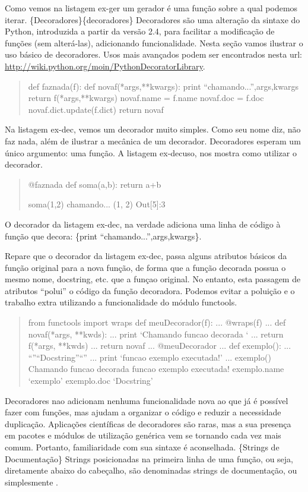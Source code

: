 \documentclass[a4paper,10pt,brazil]{sphinxmanual}
\begin{document}
Como vemos na listagem ex-ger um gerador é uma função sobre a qual
podemos iterar. \{Decoradores\}\{decoradores\} Decoradores são uma
alteração da sintaxe do Python, introduzida a partir da versão 2.4,
para facilitar a modificação de funções (sem alterá-las),
adicionando funcionalidade. Nesta seção vamos ilustrar o uso básico
de decoradores. Usos mais avançados podem ser encontrados nesta
url: \href{http://wiki.python.org/moin/PythonDecoratorLibrary}{http://wiki.python.org/moin/PythonDecoratorLibrary}.
\begin{quote}

def faznada(f): def novaf(*args,**kwargs): print
``chamando...'',args,kwargs return f(*args,**kwargs) novaf.name =
f.name novaf.doc = f.doc novaf.dict.update(f.dict) return novaf
\end{quote}

Na listagem ex-dec, vemos um decorador muito simples. Como seu nome
diz, não faz nada, além de ilustrar a mecânica de um decorador.
Decoradores esperam um único argumento: uma função. A listagem
ex-decuso, nos mostra como utilizar o decorador.
\begin{quote}

@faznada def soma(a,b): return a+b

soma(1,2) chamando... (1, 2) Out{[}5{]}:3
\end{quote}

O decorador da listagem ex-dec, na verdade adiciona uma linha de
código à função que decora: \{print ``chamando...'',args,kwargs\}.

Repare que o decorador da listagem ex-dec, passa alguns atributos
básicos da função original para a nova função, de forma que a
função decorada possua o mesmo nome, docstring, etc. que a funçao
original. No entanto, esta passagem de atributos ``polui'' o código
da função decoradora. Podemos evitar a poluição e o trabalho extra
utilizando a funcionalidade do módulo functools.
\begin{quote}

from functools import wraps def meuDecorador(f): ... @wraps(f) ...
def novaf(*args, **kwds): ... print `Chamando funcao decorada `
... return f(*args, **kwds) ... return novaf ... @meuDecorador
... def exemplo(): ... ``''``Docstring''``'' ... print `funcao exemplo
executada!' ... exemplo() Chamando funcao decorada funcao exemplo
executada! exemplo.name `exemplo' exemplo.doc `Docstring'
\end{quote}

Decoradores nao adicionam nenhuma funcionalidade nova ao que já é
possível fazer com funções, mas ajudam a organizar o código e
reduzir a necessidade duplicação. Aplicações científicas de
decoradores são raras, mas a sua presença em pacotes e módulos de
utilização genérica vem se tornando cada vez mais comum. Portanto,
familiaridade com sua sintaxe é aconselhada.
\{Strings de Documentação\} Strings posicionadas na primeira linha de
uma função, ou seja, diretamente abaixo do cabeçalho, são
denominadas strings de documentação, ou simplesmente
.
\end{document}
